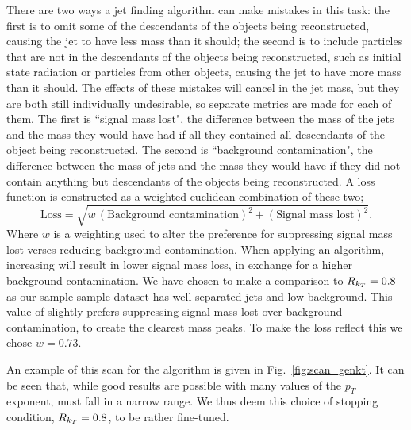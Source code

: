 There are two ways a jet finding algorithm can make mistakes in this task:
the first is to omit some of the descendants of the objects being reconstructed, causing the jet to have less mass than it should;
the second is to include particles that are not in the descendants of the objects being reconstructed, such as initial state radiation or particles from other objects,
causing the jet to have more mass than it should.
The effects of these mistakes will cancel in the jet mass,
but they are both still individually undesirable,
so separate metrics are made for each of them.
The first is ``signal mass lost", the difference between the mass of the jets and the mass they would have had if all they contained all descendants of the object being reconstructed.
The second is ``background contamination", the difference between the mass of jets and the mass they would have if they did not contain anything but descendants of the objects being reconstructed.
A loss function is constructed as a weighted euclidean combination of these two;
\begin{equation}\label{eqn:loss}
\text{Loss} = \sqrt{w\,(\text{Background contamination})^2 + (\text{Signal mass lost})^2}.
\end{equation}
Where \(w\) is a weighting used to alter the preference for suppressing signal mass lost verses reducing background contamination.
When applying an \antikt{} algorithm, increasing \ktstoppingdeltar{} will result in lower signal mass loss, in exchange for a higher background contamination.
We have chosen to make a comparison to \(R_{k_T}{}=0.8\) as our sample sample dataset has well separated jets and low background.
This value of \ktstoppingdeltar{} slightly prefers suppressing signal mass lost over background contamination,
to create the clearest mass peaks.
To make the loss reflect this we chose \(w = 0.73\).

An example of this scan for the \genkt{} algorithm is given in Fig.~\ref{fig:scan_genkt}. 
It can be seen that, while good results are possible with many values of the \(p_T\) exponent,
                \ktstoppingdeltar{} must fall in a narrow range. We thus deem this choice of  stopping condition, \(R{}_{k_T}=0.8\), to be rather fine-tuned.


